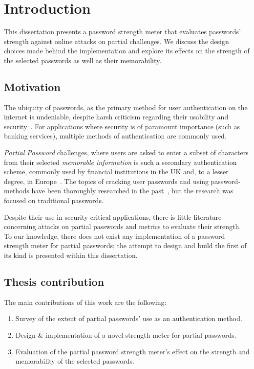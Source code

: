 
\chapter{Introduction}
  \label{cha:intro}
  This dissertation presents a password strength meter that evaluates passwords' strength against online attacks on partial challenges. We discuss the design choices made behind the implementation and explore its effects on the strength of the selected passwords as well as their memorability.

  \section{Motivation}
    \label{sec:motivation}
    The ubiquity of passwords, as the primary method for user authentication on the internet is undeniable, despite harsh criticism regarding their usability and security~\cite{replace_pass}. For applications where security is of paramount importance (such as banking services), multiple methods of authentication are commonly used.

    \emph{Partial Password} challenges, where users are asked to enter a subset of characters from their selected \emph{memorable information} is such a secondary authentication scheme, commonly used by financial institutions in the UK and, to a lesser degree, in Europe~\cite{2fa_uk}. The topics of cracking user passwords and using password-methods have been thoroughly researched in the past~\cite{pass_strength_empirical,pass_strength}, but the research was focused on traditional passwords.

    Despite their use in security-critical applications, there is little literature concerning attacks on partial passwords and metrics to evaluate their strength. To our knowledge, there does not exist any implementation of a password strength meter for partial passwords; the attempt to design and build the first of its kind is presented within this dissertation.


  \section{Thesis contribution}
    \label{sec:contribution}
    The main contributions of this work are the following:
    \begin{enumerate}
      \setlength{\itemsep}{2pt}
      \setlength{\parskip}{0pt}
      \setlength{\parsep}{0pt}
      \item Survey of the extent of partial passwords' use as an authentication method.
      \item Design \& implementation of a novel strength meter for partial passwords.
      \item Evaluation of the partial password strength meter's effect on the strength and memorability of the selected passwords.
    \end{enumerate}


